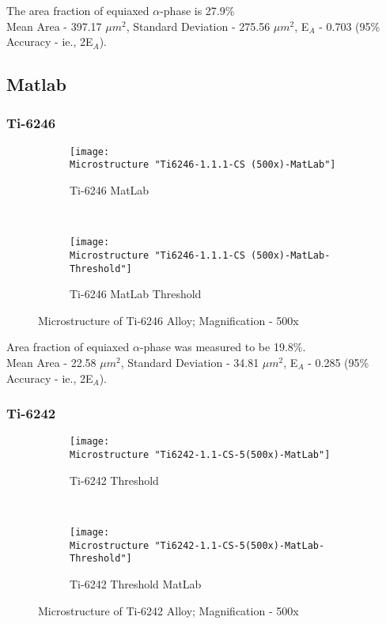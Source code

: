 The area fraction of equiaxed $\alpha$-phase is 27.9\% \\
Mean Area - 397.17 $\mu m^{2}$, Standard Deviation - 275.56 $\mu m^{2}$, E$_{A}$ - 0.703 (95\% Accuracy - ie., 2E$_{A}$).

\subsection{Matlab}

\subsubsection{Ti-6246}

\begin{figure}[H]
    \centering
    \begin{subfigure}{0.49\textwidth}
        \texttt{[image: \\Microstructure "Ti6246-1.1.1-CS (500x)-MatLab"]}
        \caption{Ti-6246 MatLab}
        \label{fig:Ti-6246 Threshold}
    \end{subfigure}
    ~
    \begin{subfigure}{0.49\textwidth}
        \texttt{[image: \\Microstructure "Ti6246-1.1.1-CS (500x)-MatLab-Threshold"]}
        \caption{Ti-6246 MatLab Threshold}
        \label{fig:Ti-6246 Outline}
    \end{subfigure}
  
    \caption{Microstructure of Ti-6246 Alloy; Magnification - 500x}
    \label{fig:As-Received-SEM}
\end{figure}

Area fraction of equiaxed $\alpha$-phase was measured to be 19.8\%.
\\
Mean Area - 22.58 $\mu m^{2}$, Standard Deviation - 34.81 $\mu m^{2}$, E$_{A}$ - 0.285 (95\% Accuracy - ie., 2E$_{A}$). 

\subsubsection{Ti-6242}
\begin{figure}[H]
    \centering
    \begin{subfigure}{0.49\textwidth}
        \texttt{[image: \\Microstructure "Ti6242-1.1-CS-5(500x)-MatLab"]}
        \caption{Ti-6242 Threshold}
        \label{fig:Ti-6242 Threshold}
    \end{subfigure}
    ~
    \begin{subfigure}{0.49\textwidth}
        \texttt{[image: \\Microstructure "Ti6242-1.1-CS-5(500x)-MatLab-Threshold"]}
        \caption{Ti-6242 Threshold MatLab}
        \label{fig:Ti-6242 Threshold MatLab}
    \end{subfigure}
  
    \caption{Microstructure of Ti-6242 Alloy; Magnification - 500x}
    \label{fig:As-Received}
\end{figure}



